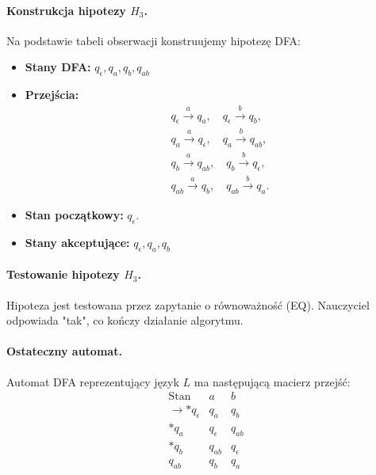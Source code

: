 \paragraph*{Konstrukcja hipotezy $H_3$.}
Na podstawie tabeli obserwacji konstruujemy hipotezę DFA:
\begin{itemize}
    \item \textbf{Stany DFA:} \( q_\epsilon, q_a, q_b, q_{ab} \)
    \item \textbf{Przejścia:}
    \begin{align*}
        & q_\epsilon \xrightarrow{a} q_a, \quad q_\epsilon \xrightarrow{b} q_b, \\
        & q_a \xrightarrow{a} q_\epsilon, \quad q_a \xrightarrow{b} q_{ab}, \\
        & q_b \xrightarrow{a} q_{ab}, \quad q_b \xrightarrow{b} q_\epsilon, \\
        & q_{ab} \xrightarrow{a} q_b, \quad q_{ab} \xrightarrow{b} q_a.
    \end{align*}
    \item \textbf{Stan początkowy:} \( q_\epsilon \).
    \item \textbf{Stany akceptujące:} \( q_\epsilon, q_a, q_b \)
\end{itemize}

\paragraph*{Testowanie hipotezy $H_3$.}
Hipoteza jest testowana przez zapytanie o równoważność (EQ). Nauczyciel odpowiada "tak", co kończy działanie algorytmu.

\paragraph*{Ostateczny automat.}
Automat DFA reprezentujący język \( L \) ma następującą macierz przejść:
\[
\begin{array}{c|c|c}
\text{Stan} & a & b \\
\hline
\rightarrow * q_\epsilon & q_a & q_b \\
* q_a & q_\epsilon & q_{ab} \\
* q_b & q_{ab} & q_\epsilon \\
q_{ab} & q_b & q_a \\
\end{array}
\]

